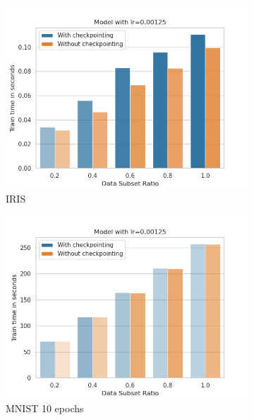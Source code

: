 \begin{figure}[h]
    \centering
    \begin{subfigure}[b]{0.24\textwidth}
        \centering
        \includegraphics[width=\textwidth]{figures/22_07/iris/train_subset_0.00125.png}
        \caption{IRIS}
        \label{fig:11a}
    \end{subfigure}
    \begin{subfigure}[b]{0.24\textwidth}
        \centering
        \includegraphics[width=\textwidth]{figures/22_07/10ep/train_subset_0.00125.png}
        \caption{MNIST 10 epochs}
        \label{fig:11b}
    \end{subfigure}
    \begin{subfigure}[b]{0.24\textwidth}

\end{subfigure}
\end{figure}
